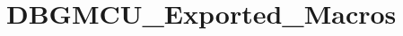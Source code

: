 \hypertarget{group__DBGMCU__Exported__Macros}{
\section{DBGMCU\_\-Exported\_\-Macros}
\label{group__DBGMCU__Exported__Macros}
}
